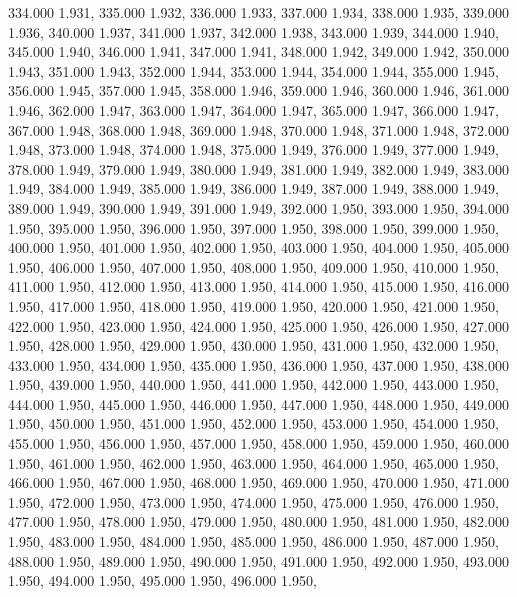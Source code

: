 334.000 1.931, 
335.000 1.932, 
336.000 1.933, 
337.000 1.934, 
338.000 1.935, 
339.000 1.936, 
340.000 1.937, 
341.000 1.937, 
342.000 1.938, 
343.000 1.939, 
344.000 1.940, 
345.000 1.940, 
346.000 1.941, 
347.000 1.941, 
348.000 1.942, 
349.000 1.942, 
350.000 1.943, 
351.000 1.943, 
352.000 1.944, 
353.000 1.944, 
354.000 1.944, 
355.000 1.945, 
356.000 1.945, 
357.000 1.945, 
358.000 1.946, 
359.000 1.946, 
360.000 1.946, 
361.000 1.946, 
362.000 1.947, 
363.000 1.947, 
364.000 1.947, 
365.000 1.947, 
366.000 1.947, 
367.000 1.948, 
368.000 1.948, 
369.000 1.948, 
370.000 1.948, 
371.000 1.948, 
372.000 1.948, 
373.000 1.948, 
374.000 1.948, 
375.000 1.949, 
376.000 1.949, 
377.000 1.949, 
378.000 1.949, 
379.000 1.949, 
380.000 1.949, 
381.000 1.949, 
382.000 1.949, 
383.000 1.949, 
384.000 1.949, 
385.000 1.949, 
386.000 1.949, 
387.000 1.949, 
388.000 1.949, 
389.000 1.949, 
390.000 1.949, 
391.000 1.949, 
392.000 1.950, 
393.000 1.950, 
394.000 1.950, 
395.000 1.950, 
396.000 1.950, 
397.000 1.950, 
398.000 1.950, 
399.000 1.950, 
400.000 1.950, 
401.000 1.950, 
402.000 1.950, 
403.000 1.950, 
404.000 1.950, 
405.000 1.950, 
406.000 1.950, 
407.000 1.950, 
408.000 1.950, 
409.000 1.950, 
410.000 1.950, 
411.000 1.950, 
412.000 1.950, 
413.000 1.950, 
414.000 1.950, 
415.000 1.950, 
416.000 1.950, 
417.000 1.950, 
418.000 1.950, 
419.000 1.950, 
420.000 1.950, 
421.000 1.950, 
422.000 1.950, 
423.000 1.950, 
424.000 1.950, 
425.000 1.950, 
426.000 1.950, 
427.000 1.950, 
428.000 1.950, 
429.000 1.950, 
430.000 1.950, 
431.000 1.950, 
432.000 1.950, 
433.000 1.950, 
434.000 1.950, 
435.000 1.950, 
436.000 1.950, 
437.000 1.950, 
438.000 1.950, 
439.000 1.950, 
440.000 1.950, 
441.000 1.950, 
442.000 1.950, 
443.000 1.950, 
444.000 1.950, 
445.000 1.950, 
446.000 1.950, 
447.000 1.950, 
448.000 1.950, 
449.000 1.950, 
450.000 1.950, 
451.000 1.950, 
452.000 1.950, 
453.000 1.950, 
454.000 1.950, 
455.000 1.950, 
456.000 1.950, 
457.000 1.950, 
458.000 1.950, 
459.000 1.950, 
460.000 1.950, 
461.000 1.950, 
462.000 1.950, 
463.000 1.950, 
464.000 1.950, 
465.000 1.950, 
466.000 1.950, 
467.000 1.950, 
468.000 1.950, 
469.000 1.950, 
470.000 1.950, 
471.000 1.950, 
472.000 1.950, 
473.000 1.950, 
474.000 1.950, 
475.000 1.950, 
476.000 1.950, 
477.000 1.950, 
478.000 1.950, 
479.000 1.950, 
480.000 1.950, 
481.000 1.950, 
482.000 1.950, 
483.000 1.950, 
484.000 1.950, 
485.000 1.950, 
486.000 1.950, 
487.000 1.950, 
488.000 1.950, 
489.000 1.950, 
490.000 1.950, 
491.000 1.950, 
492.000 1.950, 
493.000 1.950, 
494.000 1.950, 
495.000 1.950, 
496.000 1.950, 
